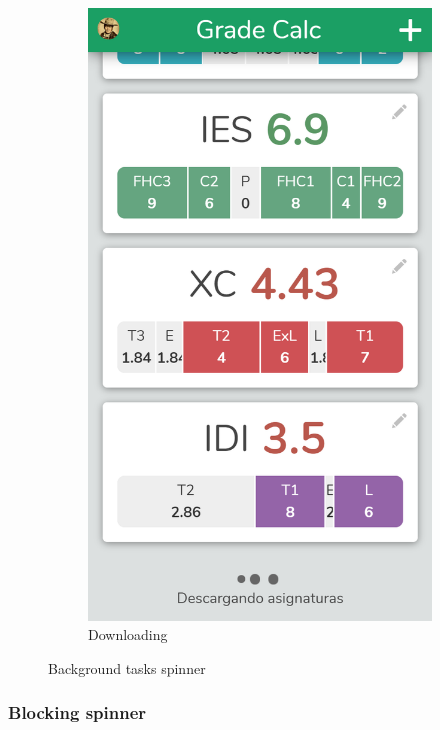 \begin{figure}[ht!]
\begin{subfigure}[b]{0.3333\textwidth-0.1cm}
        \includegraphics[width=\textwidth]{media/screenshots/screenshot-loader-descargando.png}
        \caption{Downloading}
    \end{subfigure}
    \caption{Background tasks spinner}
    \label{fig:spinner}
\end{figure}
\vfill

\clearpage\newpage
\subsubsection{Blocking spinner}

